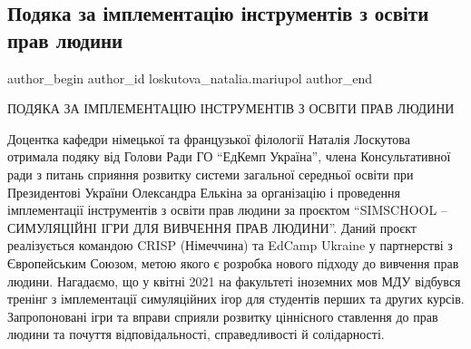  
 
 
 
 

\subsection{Подяка за імплементацію інструментів з освіти прав людини}
\label{sec:13_09_2021.fb.loskutova_natalia.mariupol.2.podjaka_implementacia_instrumentiv}

\ifcmt
 author_begin
   author_id loskutova_natalia.mariupol
 author_end
\fi

ПОДЯКА ЗА ІМПЛЕМЕНТАЦІЮ ІНСТРУМЕНТІВ З ОСВІТИ ПРАВ ЛЮДИНИ

Доцентка кафедри німецької та французької філології Наталія Лоскутова отримала
подяку від Голови Ради ГО \enquote{ЕдКемп Україна}, члена Консультативної ради з питань
сприяння розвитку системи загальної середньої освіти при Президентові України
Олександра Елькіна за організацію і проведення імплементації інструментів з
освіти прав людини за проєктом \enquote{SIMSCHOOL – СИМУЛЯЦІЙНІ ІГРИ ДЛЯ ВИВЧЕННЯ ПРАВ
ЛЮДИНИ}. Даний проєкт реалізується командою CRISP (Німеччина) та EdCamp Ukraine
у партнерстві з Європейським Союзом, метою якого є розробка нового підходу до
вивчення прав людини. Нагадаємо, що у квітні 2021 на факультеті іноземних мов
МДУ відбувся тренінг з імплементації симуляційних ігор для студентів перших та
других курсів. Запропоновані ігри та вправи сприяли розвитку ціннісного
ставлення до прав людини та почуття відповідальності, справедливості й
солідарності.

